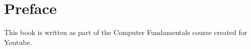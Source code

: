 \chapter*{Preface} 
{}
This book is written as part of the Computer Fundamentals course created for Youtube.